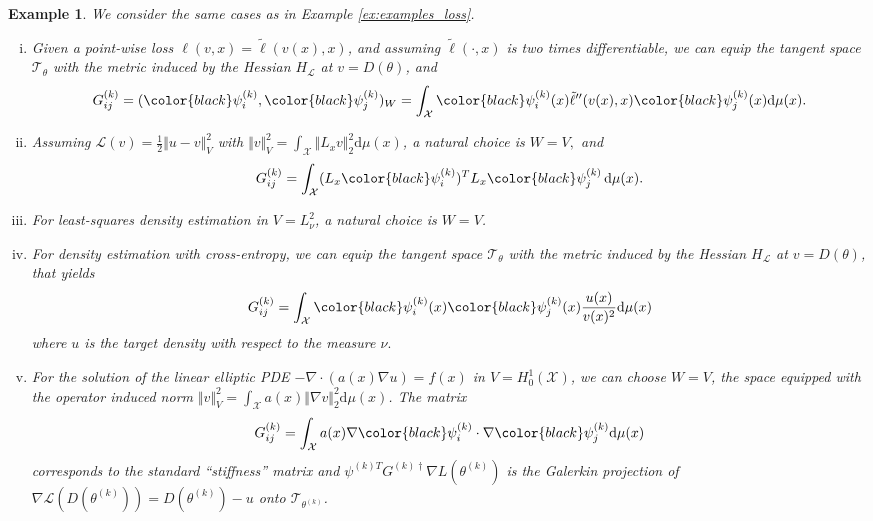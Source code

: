 \documentclass{article}
\theoremstyle{noparens}
\newtheorem{example}{Example}[section]
\newcommand{\cL}{\mathcal{L}}
\newcommand{\cT}{\mathcal{T}}
\newcommand{\cX}{\mathcal{X}}
\newcommand{\dd}{\mathrm{d}}
\newcommand{\colorM}{\color{black}}
\newcommand{\paramk}{\theta^{(k)}}
\newcommand{\glossk}{{\nabla L(\paramk)}}
\newcommand{\psikT}{\psi^{(k)T}}
\newcommand{\psiki}{{\colorM \psi^{(k)}_i}}
\newcommand{\psikj}{{\colorM \psi^{(k)}_j}}
\newcommand{\Ginvk}{{G^{(k)\dagger}}}
\begin{document}
\vspace{10pt}
\begin{example}

We consider the same cases as in  Example \ref{ex:examples_loss}.
\begin{enumerate}[(i)]
\item Given a point-wise loss $\ell(v , x) = \tilde \ell(v(x) , x)$, and  assuming $\tilde \ell( \cdot , x)$ is two times differentiable, we can equip the tangent space $\cT_{\theta}$ with the metric induced by the Hessian $H_\cL$ at $v = D(\theta)$, and
$$G^{(k)}_{ij}=(\psiki, \psikj)_W = \int_{\cX} \psiki(x) \tilde \ell''(v(x) , x) \psikj(x) \dd\mu(x). $$
\item Assuming $\cL(v) = \frac{1}{2} \Vert u-v \Vert_V^2$ with  $\Vert v \Vert_V^2 = \int_{\cX} \Vert L_x v \Vert_2^2 \dd\mu(x)$,  a natural choice is $W= V, $ and
$$
G^{(k)}_{ij} = \int_\cX (L_x \psiki)^T L_x \psikj \, \dd\mu(x).
$$
\item For least-squares density estimation in $V = L^2_\nu$, a natural choice is $W=V$.
\item For density estimation with cross-entropy, we can equip the tangent space $\cT_{\theta}$ with the metric induced by the Hessian $H_\cL$ at $v = D(\theta)$, that yields
$$
G^{(k)}_{ij} = \int_\cX \psiki(x) \psikj(x) \frac{u(x)}{v(x)^2} \dd\mu(x)
$$
where $u$ is the target density with respect to the measure $\nu.$
\item For the solution of the linear elliptic PDE $- \nabla \cdot (a(x) \nabla u) = f(x)$ in $V = H^1_0(\cX)$, we can choose $W=V$, the space equipped with the operator induced norm $\Vert v \Vert_V^2 = \int_{\cX} a(x) \Vert \nabla v \Vert_2^2 \dd\mu(x)$. The matrix
$$
G^{(k)}_{ij} = \int_\cX a(x) \nabla \psiki  \cdot \nabla \psikj \dd\mu(x)
$$
corresponds to the standard ``stiffness'' matrix and $\psikT\Ginvk\glossk$ is the Galerkin projection of $\nabla \cL(D(\paramk)) = D(\paramk) - u$ onto $\cT_{\paramk}$.
\end{enumerate}
\end{example}
\end{document}
